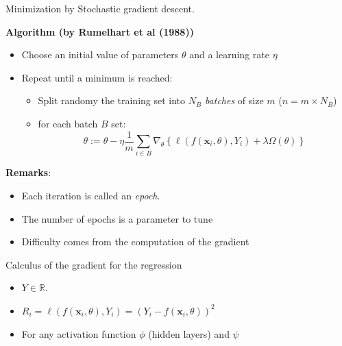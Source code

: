 \documentclass[ignorenonframetext,]{beamer}
\providecommand{\tightlist}{%
  \setlength{\itemsep}{0pt}\setlength{\parskip}{0pt}}
\begin{document}
\begin{frame}{Minimization by Stochastic gradient descent.}
\protect\hypertarget{minimization-by-stochastic-gradient-descent.}{}

\textbf{Algorithm (by Rumelhart et al (1988))}

\begin{itemize}
\item
  Choose an initial value of parameters \(\theta\) and a learning rate
  \(\eta\)
\item
  Repeat until a minimum is reached:

  \begin{itemize}
  \tightlist
  \item
    Split randomy the training set into \(N_B\) \emph{batches} of size
    \(m\) (\(n = m \times N_B\))
  \item
    for each batch \(B\) set:
    \[ \theta:= \theta - \eta \frac{1}{m}\sum_{i \in B} \nabla_{\theta} \left\{  \ell(f(\mathbf{x}_i,\theta),Y_i) + \lambda   \Omega(\theta)\right\}\]
  \end{itemize}
\end{itemize}

\textbf{Remarks}:

\begin{itemize}
\item
  Each iteration is called an \emph{epoch}.
\item
  The number of epochs is a parameter to tune
\item
  Difficulty comes from the computation of the gradient
\end{itemize}

\end{frame}

\begin{frame}{Calculus of the gradient for the regression}
\protect\hypertarget{calculus-of-the-gradient-for-the-regression}{}

\begin{itemize}
\tightlist
\item
  \(Y \in \mathbb{R}\).
\item
  \(R_i = \ell(f(\mathbf{x}_i,\theta),Y_i) = (Y_{i} - f(\mathbf{x}_i,\theta))^2\)
\item
  For any activation function \(\phi\) (hidden layers) and \(\psi\)
\end{itemize}

\end{frame}
\end{document}
